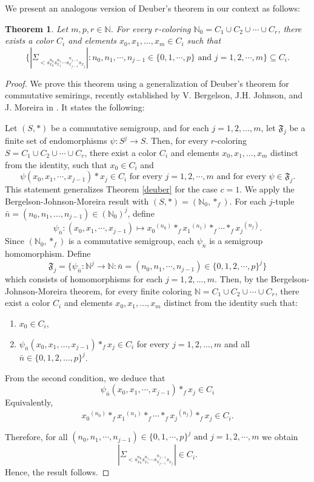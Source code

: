 \documentclass[12pt]{amsart}
\theoremstyle{plain}
\newtheorem{theorem}{Theorem}[section]
\theoremstyle{definition}
\theoremstyle{remark}
\numberwithin{equation}{section}
\begin{document}
We present an analogous version of Deuber's theorem in our context as follows:

\begin{theorem}
\label{newDeuber}
Let $m, p, r \in \mathbb{N}$. For every $r$-coloring $\mathbb{N}_0 = C_1 \cup C_2  \cup \cdots \cup C_r$, there exists a color $C_i$ and elements $x_0, x_1, \dots, x_m \in C_i$ such that
 \[
 \{\left|\Sigma_{<{s_{x_0}^{n_0}}{s_{x_1}^{n_1}} \cdots {s_{x_{j-1}}^{n_{j-1}}} {s_{x_j}}}\right| : n_0, n_1, \cdots, n_{j-1} \in \{0,1, \cdots, p\} \mbox{ and } j=1,2, \cdots, m \}  \subseteq  C_i
 .\]
\end{theorem}
\begin{proof}
We prove this theorem using a generalization of Deuber's theorem for commutative semirings, recently established by V. Bergelson, J.H. Johnson, and J. Moreira in \cite[Corollary 3.7]{BJM17}. It states the following:

Let $(S, \ast)$ be a commutative semigroup, and for each $j=1,2, \dots, m$, let $\mathfrak{F}_j$ be a finite set of endomorphisms $\psi : S^j \to S$. Then, for every $r$-coloring $S=C_1 \cup C_2  \cup \cdots \cup C_r$, there exist a color $C_i$ and elements $x_0, x_1, \dots, x_m$ distinct from the identity, such that $x_0 \in C_i$ and
 \[
 \psi(x_0, x_1, \cdots, x_{j-1}) \ast x_j \in C_i \mbox{ for every } j=1,2, \cdots, m \mbox{ and for every } \psi \in \mathfrak{F}_j.\]
%
This statement generalizes Theorem \ref{deuber} for the case $c=1$. We apply the Bergelson-Johnson-Moreira result with $(S, \ast) = (\mathbb{N}_0, \ast_f)$. For each $j$-tuple $\bar{n}=(n_0, n_1, \dots, n_{j-1}) \in (\mathbb{N}_0)^j$, define 
\[
\psi_{\bar{n}} : (x_0, x_1, \cdots, x_{j-1})\mapsto {x_0}^{(n_0)} \ast_f  {x_1}^{(n_1)} \ast_f \cdots \ast_f  {x_j}^{(n_j)}.
\]
%
Since $(\mathbb{N}_0, \ast_f)$ is a commutative semigroup, each $\psi_{\bar{n}}$ is a semigroup homomorphism. Define 
\[
\mathfrak{F}_j= \{\psi_{\bar{n}} : \mathbb{N}^j \rightarrow \mathbb{N} : \bar{n}=(n_0, n_1, \cdots, n_{j-1}) \in \{0,1,2, \cdots, p\}^j\}
\]
which consists of homomorphisms for each $j=1,2, \dots, m$. Then, by the Bergelson-Johnson-Moreira theorem, for every finite coloring $\mathbb{N}= C_1 \cup C_2  \cup \cdots \cup C_r$, there exist a color $C_i$ and elements $x_0, x_1, \dots, x_m$ distinct from the identity such that:

\begin{enumerate}
\item $x_0 \in C_i$,
\item $\psi_{\bar{n}}(x_0, x_1, \dots, x_{j-1}) \ast_f x_j \in C_i$ for every $j=1,2, \dots, m$ and all $\bar{n} \in \{0,1,2, \dots, p\}^j$.
\end{enumerate}
%
From the second condition, we deduce that 
\[
\psi_{\bar{n}}(x_0,x_1, \cdots, x_{j-1}) \ast_f x_j \in C_i
\]
Equivalently, 
\[
{x_0}^{(n_0)} \ast_f  {x_1}^{(n_1)} \ast_f \cdots \ast_f  {x_j}^{(n_j)} \ast_f x_j \in C_i.
\]

Therefore, for all $(n_0, n_1, \cdots, n_{j-1}) \in \{0,1, \cdots, p\}^j \mbox{ and } j=1,2, \cdots, m$ we obtain 
$$\left|\Sigma_{<{s_{x_0}^{n_0}}{s_{x_1}^{n_1}} \cdots {s_{x_{j-1}}^{n_{j-1}}} {s_{x_j}}}\right| \in C_i.$$ 
Hence, the result follows.
\end{proof}
\end{document}
